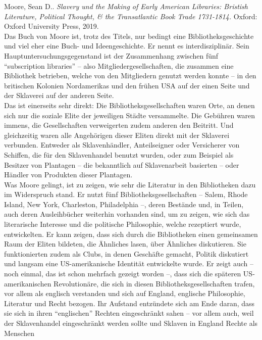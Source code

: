 \documentclass[a4paper,
fontsize=11pt,
oneside,
numbers=noperiodatend,
parskip=half-,
bibliography=totoc,
final
]{scrartcl}
\begin{document}
Moore, Sean D.. \emph{Slavery und the Making of Early American
Libraries: Bristish Literature, Political Thought, \& the Transatlantic
Book Trade 1731-1814.} Oxford: Oxford University Press, 2019.\\
Das Buch von Moore ist, trotz des Titels, nur bedingt eine
Bibliotheksgeschichte und viel eher eine Buch- und Ideengeschichte. Er
nennt es interdisziplinär. Sein Hauptuntersuchungsgegenstand ist der
Zusammenhang zwischen fünf ``subscription libraries'' -- also
Mitgliedergesellschaften, die zusammen eine Bibliothek betrieben, welche
von den Mitgliedern genutzt werden konnte -- in den britischen Kolonien
Nordamerikas und den frühen USA auf der einen Seite und der Sklaverei
auf der anderen Seite.\\
Das ist einerseits sehr direkt: Die Bibliotheksgesellschaften waren
Orte, an denen sich nur die soziale Elite der jeweiligen Städte
versammelte. Die Gebühren waren immens, die Gesellschaften verweigerten
zudem anderen den Beitritt. Und gleichzeitig waren alle Angehörigen
dieser Eliten direkt mit der Sklaverei verbunden. Entweder als
Sklavenhändler, Anteilseigner oder Versicherer von Schiffen, die für den
Sklavenhandel benutzt wurden, oder zum Beispiel als Besitzer von
Plantagen -- die bekanntlich auf Sklavenarbeit basierten -- oder Händler
von Produkten dieser Plantagen.\\
Was Moore gelingt, ist zu zeigen, wie sehr die Literatur in den
Bibliotheken dazu im Widerspruch stand. Er nutzt fünf
Bibliotheksgesellschaften -- Salem, Rhode Island, New York, Charleston,
Philadelphia --, deren Bestände und, in Teilen, auch deren Ausleihbücher
weiterhin vorhanden sind, um zu zeigen, wie sich das literarische
Interesse und die politische Philosophie, welche rezeptiert wurde,
entwickelten. Er kann zeigen, dass sich durch die Bibliotheken einen
gemeinsamen Raum der Eliten bildeten, die Ähnliches lasen, über
Ähnliches diskutieren. Sie funktionierten zudem als Clubs, in denen
Geschäfte gemacht, Politik diskutiert und langsam eine US-amerikanische
Identität entwickelte wurde. Er zeigt auch -- noch einmal, das ist schon
mehrfach gezeigt worden --, dass sich die späteren US-amerikanischen
Revolutionäre, die sich in diesen Bibliotheksgesellschaften trafen, vor
allem als englisch verstanden und sich auf England, englische
Philosophie, Literatur und Recht bezogen. Ihr Aufstand entzündete sich
am Ende daran, dass sie sich in ihren ``englischen'' Rechten
eingeschränkt sahen -- vor allem auch, weil der Sklavenhandel
eingeschränkt werden sollte und Sklaven in England Rechte als Menschen
\end{document}
